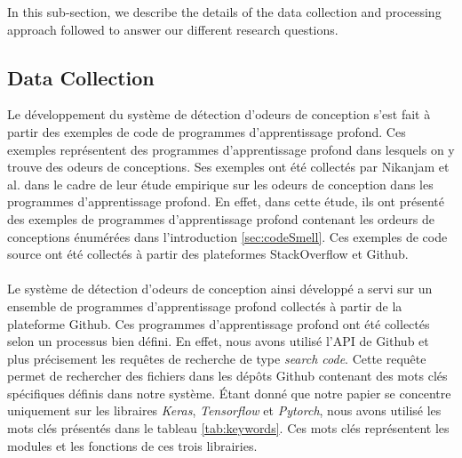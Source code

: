 \label{sec:studyDesign}
In this sub-section, we describe the details of the data collection and processing approach followed to answer our different research questions.





\subsection{Data Collection}
\label{sec:dataCollection}
Le développement du système de détection d'odeurs de conception s'est fait à
partir des exemples de code de programmes d'apprentissage profond. Ces exemples
représentent des programmes d'apprentissage profond dans lesquels on y trouve
des odeurs de conceptions. Ses exemples ont été collectés par Nikanjam et al.
\cite{nikanjam2021design} dans
le cadre de leur étude empirique sur les odeurs de conception dans les
programmes d'apprentissage profond. En effet, dans cette étude, ils
ont présenté des exemples de programmes d'apprentissage profond contenant les
ordeurs de conceptions énumérées dans l'introduction \ref{sec:codeSmell}. Ces
exemples de code source ont été collectés à partir des plateformes StackOverflow
et Github.\\\\

Le système de détection d'odeurs de conception ainsi développé a servi sur un
ensemble de programmes d'apprentissage profond collectés à partir de la
plateforme Github. Ces programmes d'apprentissage profond ont été collectés
selon un processus bien défini. En effet, nous avons utilisé l'API de Github et
plus précisement les requêtes de recherche de type \emph{search code}. Cette requête
permet de rechercher des fichiers dans les dépôts Github contenant des mots clés
spécifiques définis dans notre système. Étant donné que notre papier se
concentre uniquement sur les libraires \emph{Keras}, \emph{Tensorflow} et \emph{Pytorch}, nous avons utilisé les mots
clés présentés dans le tableau \ref{tab:keywords}. Ces mots clés
représentent les modules et les fonctions de ces trois librairies.\\



